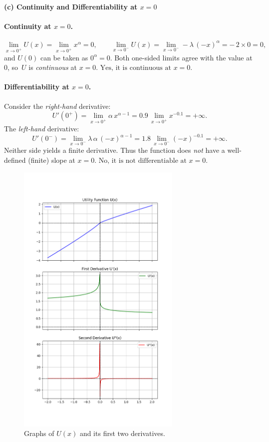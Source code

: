 \documentclass[12pt]{article}
\begin{document}
\bigskip
\newpage

\noindent \textbf{(c) Continuity and Differentiability at \(x=0\)}

\paragraph{Continuity at \(x=0\).}
\[
\lim_{x \to 0^+}U(x) = \lim_{x\to 0^+} x^\alpha = 0,\qquad
\lim_{x \to 0^-}U(x) = \lim_{x\to 0^-} -\lambda\,(-x)^\alpha = -\,2\times 0 = 0,
\]
and \(U(0)\) can be taken as \(0^\alpha = 0\). Both one-sided limits agree with the value at 0, so \(\,U\) is \emph{continuous} at \(x=0\).  
\(\boxed{\text{Yes, it is continuous at } x=0.}\)

\paragraph{Differentiability at \(x=0\).}
Consider the \emph{right-hand} derivative:
\[
U'(0^+) = \lim_{x\to 0^+} \alpha\,x^{\alpha-1} 
= 0.9 \,\lim_{x\to 0^+} x^{-0.1} 
= +\infty.
\]
The \emph{left-hand} derivative:
\[
U'(0^-) 
= \lim_{x\to 0^-} \lambda\,\alpha\,(-x)^{\alpha-1}
= 1.8 \,\lim_{x\to 0^-} (-x)^{-0.1}
= +\infty.
\]
Neither side yields a finite derivative. Thus the function does \emph{not} have a well-defined (finite) slope at \(x=0\).  
\(\boxed{\text{No, it is not differentiable at }x=0.}\)

\begin{figure}[htbp]
    \centering
    \includegraphics[width=0.7\textwidth]{q1.png}
    \caption{Graphs of \(U(x)\) and its first two derivatives.}
    \label{fig:my_label}
\end{figure}
\end{document}
